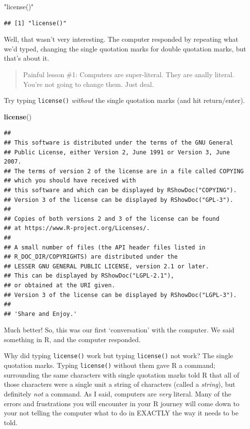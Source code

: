 \documentclass[]{article}
\newenvironment{Shaded}{\begin{snugshade}}{\end{snugshade}}
\newcommand{\KeywordTok}[1]{\textcolor[rgb]{0.13,0.29,0.53}{\textbf{#1}}}
\newcommand{\StringTok}[1]{\textcolor[rgb]{0.31,0.60,0.02}{#1}}
\newcommand{\NormalTok}[1]{#1}
\begin{document}
\begin{Shaded}
\begin{Highlighting}[]
\StringTok{"license()"}
\end{Highlighting}
\end{Shaded}

\begin{verbatim}
## [1] "license()"
\end{verbatim}

Well, that wasn't very interesting. The computer responded by repeating
what we'd typed, changing the single quotation marks for double
quotation marks, but that's about it.

\begin{quote}
Painful lesson \#1: Computers are super-literal. They are anally
literal. You're not going to change them. Just deal.
\end{quote}

Try typing \texttt{license()} \emph{without} the single quotation marks
(and hit return/enter).

\begin{Shaded}
\begin{Highlighting}[]
\KeywordTok{license}\NormalTok{()}
\end{Highlighting}
\end{Shaded}

\begin{verbatim}
## 
## This software is distributed under the terms of the GNU General
## Public License, either Version 2, June 1991 or Version 3, June 2007.
## The terms of version 2 of the license are in a file called COPYING
## which you should have received with
## this software and which can be displayed by RShowDoc("COPYING").
## Version 3 of the license can be displayed by RShowDoc("GPL-3").
## 
## Copies of both versions 2 and 3 of the license can be found
## at https://www.R-project.org/Licenses/.
## 
## A small number of files (the API header files listed in
## R_DOC_DIR/COPYRIGHTS) are distributed under the
## LESSER GNU GENERAL PUBLIC LICENSE, version 2.1 or later.
## This can be displayed by RShowDoc("LGPL-2.1"),
## or obtained at the URI given.
## Version 3 of the license can be displayed by RShowDoc("LGPL-3").
## 
## 'Share and Enjoy.'
\end{verbatim}

Much better! So, this was our first `conversation' with the computer. We
said something in R, and the computer responded.

Why did typing \texttt{license()} work but typing
\texttt{\textquotesingle{}license()\textquotesingle{}} not work? The
single quotation marks. Typing \texttt{license()} without them gave R a
command; surrounding the same characters with single quotation marks
told R that all of those characters were a single unit a string of
characters (called a \emph{string}), but definitely \emph{not} a
command. As I said, computers are \emph{very} literal. Many of the
errors and frustrations you will encounter in your R journey will come
down to your not telling the computer what to do in EXACTLY the way it
needs to be told.
\end{document}
